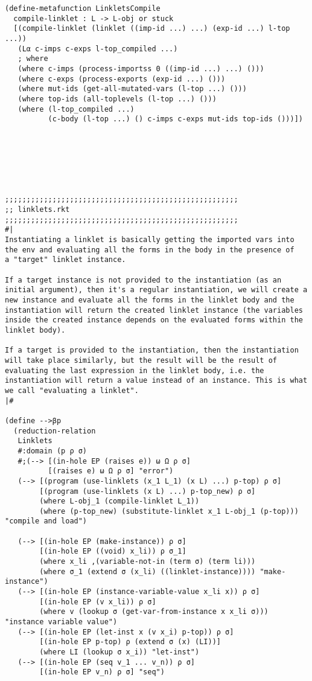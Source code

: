 \begin{lstlisting}[language=pltredex,
                basicstyle=\ttfamily\scriptsize,
                numbers=none, xleftmargin=2em]
(define-metafunction LinkletsCompile
  compile-linklet : L -> L-obj or stuck
  [(compile-linklet (linklet ((imp-id ...) ...) (exp-id ...) l-top ...))
   (Lα c-imps c-exps l-top_compiled ...)
   ; where
   (where c-imps (process-importss 0 ((imp-id ...) ...) ()))
   (where c-exps (process-exports (exp-id ...) ()))
   (where mut-ids (get-all-mutated-vars (l-top ...) ()))
   (where top-ids (all-toplevels (l-top ...) ()))
   (where (l-top_compiled ...)
          (c-body (l-top ...) () c-imps c-exps mut-ids top-ids ()))])







;;;;;;;;;;;;;;;;;;;;;;;;;;;;;;;;;;;;;;;;;;;;;;;;;;;;;;
;; linklets.rkt
;;;;;;;;;;;;;;;;;;;;;;;;;;;;;;;;;;;;;;;;;;;;;;;;;;;;;;
#|
Instantiating a linklet is basically getting the imported vars into
the env and evaluating all the forms in the body in the presence of
a "target" linklet instance.

If a target instance is not provided to the instantiation (as an
initial argument), then it's a regular instantiation, we will create a
new instance and evaluate all the forms in the linklet body and the
instantiation will return the created linklet instance (the variables
inside the created instance depends on the evaluated forms within the
linklet body).

If a target is provided to the instantiation, then the instantiation
will take place similarly, but the result will be the result of
evaluating the last expression in the linklet body, i.e. the
instantiation will return a value instead of an instance. This is what
we call "evaluating a linklet".
|#

(define -->βp
  (reduction-relation
   Linklets
   #:domain (p ρ σ)
   #;(--> [(in-hole EP (raises e)) ω Ω ρ σ]
          [(raises e) ω Ω ρ σ] "error")
   (--> [(program (use-linklets (x_1 L_1) (x L) ...) p-top) ρ σ]
        [(program (use-linklets (x L) ...) p-top_new) ρ σ]
        (where L-obj_1 (compile-linklet L_1))
        (where (p-top_new) (substitute-linklet x_1 L-obj_1 (p-top))) "compile and load")

   (--> [(in-hole EP (make-instance)) ρ σ]
        [(in-hole EP ((void) x_li)) ρ σ_1]
        (where x_li ,(variable-not-in (term σ) (term li)))
        (where σ_1 (extend σ (x_li) ((linklet-instance)))) "make-instance")
   (--> [(in-hole EP (instance-variable-value x_li x)) ρ σ]
        [(in-hole EP (v x_li)) ρ σ]
        (where v (lookup σ (get-var-from-instance x x_li σ))) "instance variable value")
   (--> [(in-hole EP (let-inst x (v x_i) p-top)) ρ σ]
        [(in-hole EP p-top) ρ (extend σ (x) (LI))]
        (where LI (lookup σ x_i)) "let-inst")
   (--> [(in-hole EP (seq v_1 ... v_n)) ρ σ]
        [(in-hole EP v_n) ρ σ] "seq")


\end{lstlisting}
